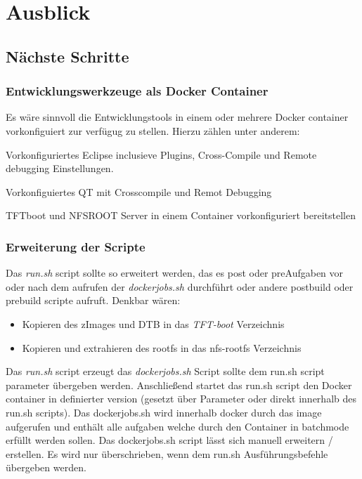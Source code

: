 
\chapter{Ausblick}%
\label{cha:ausblick}




\section{Nächste Schritte}%
\label{sec:naeste_schritte}

\subsection{Entwicklungswerkzeuge als Docker Container}%
\label{sub:developmenthost}

Es wäre sinnvoll die Entwicklungstools in einem oder mehrere Docker
container vorkonfiguiert zur verfügug zu stellen. Hierzu zählen unter anderem:

\begin{description}
    \item[Eclipse] Vorkonfiguriertes Eclipse inclusieve Plugins, Cross-Compile
        und Remote debugging Einstellungen.
    \item[QT5] Vorkonfiguiertes QT mit Crosscompile und Remot Debugging
    \item TFTboot und NFSROOT Server in einem Container vorkonfiguriert bereitstellen
\end{description}


\subsection{Erweiterung der Scripte}%
\label{sub:erweiterung_der_scripte}

Das \textit{run.sh} script sollte so erweitert werden, das es \glq post\grq
oder \glq pre\grq Aufgaben vor oder nach dem aufrufen der \textit{dockerjobs.sh}
durchführt oder andere postbuild oder prebuild scripte aufruft. Denkbar wären:

\begin{itemize}
    \item Kopieren des zImages und \ac{DTB} in das \textit{TFT-boot} Verzeichnis
    \item Kopieren und extrahieren des rootfs in das nfs-rootfs Verzeichnis
\end{itemize}


Das \textit{run.sh} script erzeugt das \textit{dockerjobs.sh} Script sollte dem
run.sh script parameter übergeben werden. Anschließend startet das run.sh script
den Docker container in definierter version (gesetzt über Parameter oder direkt
innerhalb des run.sh scripts). Das dockerjobs.sh wird innerhalb docker durch das
image aufgerufen und enthält alle aufgaben welche durch den Container in
batchmode erfüllt werden sollen. Das dockerjobs.sh script lässt sich manuell
erweitern / erstellen. Es wird nur überschrieben, wenn dem run.sh
Ausführungs\-befehle übergeben werden.



